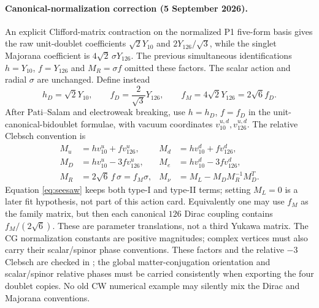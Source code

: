\documentclass[11pt]{article}
\begin{document}
\paragraph{Canonical-normalization correction (5 September 2026).}
An explicit Clifford-matrix contraction on the normalized P1 five-form
basis gives the raw unit-doublet coefficients $\sqrt2Y_{10}$ and
$2Y_{126}/\sqrt3$, while the singlet Majorana coefficient is
$4\sqrt2\,\sigma Y_{126}$. The previous simultaneous identifications
$h=Y_{10}$, $f=Y_{126}$ and $M_R=\sigma f$ omitted these factors.
The scalar action and radial $\sigma$ are unchanged. Define instead
\[
 h_D=\sqrt2Y_{10},\qquad f_D=\frac2{\sqrt3}Y_{126},\qquad
 f_M=4\sqrt2Y_{126}=2\sqrt6 f_D.
\]
After Pati--Salam and electroweak breaking, use $h=h_D$, $f=f_D$ in
the unit-canonical-bidoublet formulae, with vacuum coordinates
$v_{10}^{u,d},v_{126}^{u,d}$. The relative Clebsch convention is
\begin{align}
 M_u&=h v_{10}^u+f v_{126}^u,&
 M_d&=h v_{10}^d+f v_{126}^d,\label{eq:masssum1}\\
 M_D&=h v_{10}^u-3f v_{126}^u,&
 M_e&=h v_{10}^d-3f v_{126}^d,\label{eq:masssum2}\\
 M_R&=2\sqrt6\,f\,\sigma=f_M\sigma,&
 M_\nu&=M_L-M_D M_R^{-1}M_D^T.
 \label{eq:seesaw}
\end{align}
Equation \eqref{eq:seesaw} keeps both type-I and type-II terms; setting
$M_L=0$ is a later fit hypothesis, not part of this action card.
Equivalently one may use $f_M$ as the family matrix, but then each
canonical $126$ Dirac coupling contains $f_M/(2\sqrt6)$. These are
parameter translations, not a third Yukawa matrix. The CG normalization
constants are positive magnitudes; complex vertices must also carry their
scalar/spinor phase conventions. These factors and the relative $-3$
Clebsch are checked in
; the global matter-conjugation
orientation and scalar/spinor relative phases must be carried consistently
when exporting the four doublet copies. No old CW numerical example may
silently mix the Dirac and Majorana conventions.
\end{document}
